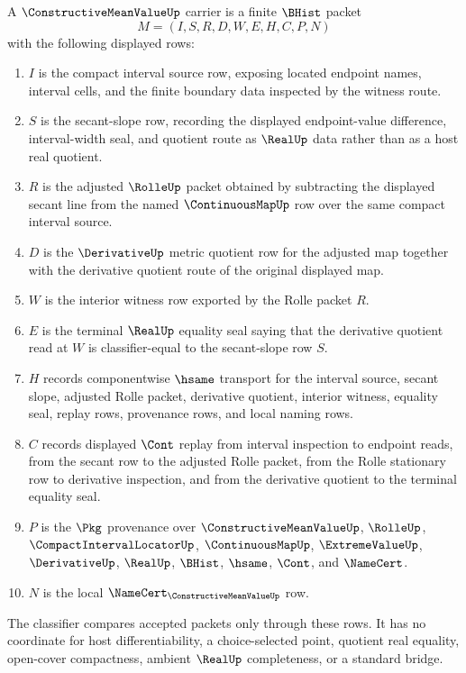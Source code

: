 \begin{definition}
\label{def:constructive-mean-value-carrier}
A $\ConstructiveMeanValueUp$ carrier is a finite $\BHist$ packet
$$
M=(I,S,R,D,W,E,H,C,P,N)
$$
with the following displayed rows:
\begin{enumerate}
\item $I$ is the compact interval source row, exposing located endpoint names, interval cells, and the finite boundary data inspected by the witness route.
\item $S$ is the secant-slope row, recording the displayed endpoint-value difference, interval-width seal, and quotient route as $\RealUp$ data rather than as a host real quotient.
\item $R$ is the adjusted $\RolleUp$ packet obtained by subtracting the displayed secant line from the named $\ContinuousMapUp$ row over the same compact interval source.
\item $D$ is the $\DerivativeUp$ metric quotient row for the adjusted map together with the derivative quotient route of the original displayed map.
\item $W$ is the interior witness row exported by the Rolle packet $R$.
\item $E$ is the terminal $\RealUp$ equality seal saying that the derivative quotient read at $W$ is classifier-equal to the secant-slope row $S$.
\item $H$ records componentwise $\hsame$ transport for the interval source, secant slope, adjusted Rolle packet, derivative quotient, interior witness, equality seal, replay rows, provenance rows, and local naming rows.
\item $C$ records displayed $\Cont$ replay from interval inspection to endpoint reads, from the secant row to the adjusted Rolle packet, from the Rolle stationary row to derivative inspection, and from the derivative quotient to the terminal equality seal.
\item $P$ is the $\Pkg$ provenance over $\ConstructiveMeanValueUp$, $\RolleUp$, $\CompactIntervalLocatorUp$, $\ContinuousMapUp$, $\ExtremeValueUp$, $\DerivativeUp$, $\RealUp$, $\BHist$, $\hsame$, $\Cont$, and $\NameCert$.
\item $N$ is the local $\NameCert_{\ConstructiveMeanValueUp}$ row.
\end{enumerate}
The classifier compares accepted packets only through these rows. It has no coordinate for host differentiability, a choice-selected point, quotient real equality, open-cover compactness, ambient $\RealUp$ completeness, or a standard bridge.
\end{definition}

